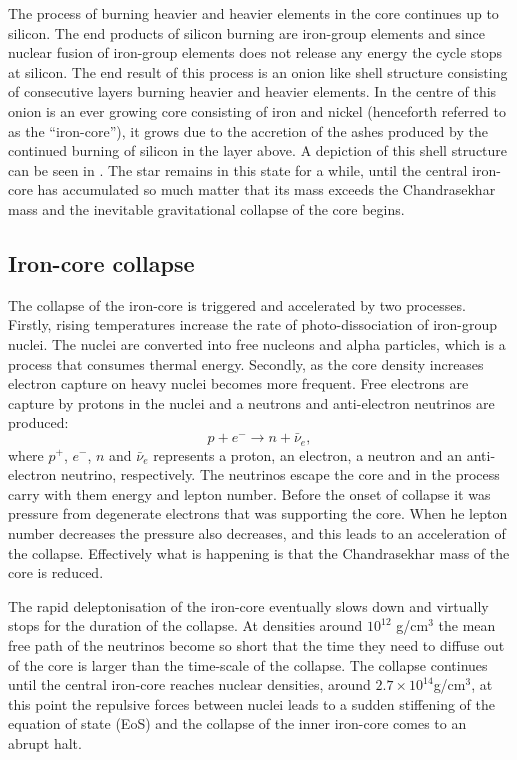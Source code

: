 The process of burning heavier and heavier elements in the core continues up to silicon. The end products of silicon burning are iron-group elements and
since nuclear fusion of iron-group elements does not release any energy the cycle stops at silicon. The end result of this process is
an onion like shell structure consisting of consecutive layers burning heavier and heavier elements. In the centre of this onion is an ever growing
core consisting of iron and nickel (henceforth referred to as the ``iron-core''), it grows due to the accretion of the ashes produced by the continued burning of silicon in the layer above. A depiction of this shell structure can be seen in .
The star remains in this state for a while,
until the central iron-core has accumulated so much matter that its mass exceeds the Chandrasekhar mass and the inevitable gravitational collapse 
of the core begins.

\subsection{Iron-core collapse}
The collapse of the iron-core is triggered and accelerated by two processes.
Firstly, rising temperatures increase the rate of photo-dissociation of iron-group 
nuclei. The nuclei are converted into free nucleons and alpha particles,
which is a process that consumes thermal energy. Secondly, as the core density increases electron capture
on heavy nuclei becomes more frequent. Free electrons are capture by protons in the nuclei and a neutrons 
and anti-electron neutrinos are produced:
\begin{equation} \label{eqSN:ecapture}
p + e^{-} \rightarrow n + \bar{\nu}_e,
\end{equation}
where $p^{+}$, $e^{-}$, $n$ and $\bar{\nu}_e$ represents a proton, an electron, 
a neutron and an anti-electron neutrino, respectively.
The neutrinos escape the core and in the process carry with them energy
and lepton number. Before the onset of collapse it was pressure from degenerate electrons
that was supporting the core. When he lepton number decreases the pressure also decreases,
and this leads to an acceleration of the collapse. Effectively what is happening is that
the Chandrasekhar mass of the core is reduced. 

The rapid deleptonisation of the iron-core eventually slows down and virtually stops for the duration of the collapse. 
At densities around $10^{12}$ g/cm$^3$ the mean free path of the neutrinos become so short that the time they need to diffuse out of the
core is larger than the time-scale of the collapse. The collapse continues until the central iron-core reaches nuclear densities, around $2.7 \times 10^{14} $g/cm$^3$,
at this point the repulsive forces between nuclei leads to a sudden stiffening of the equation of state (EoS) and the collapse of the
inner iron-core comes to an abrupt halt. 

